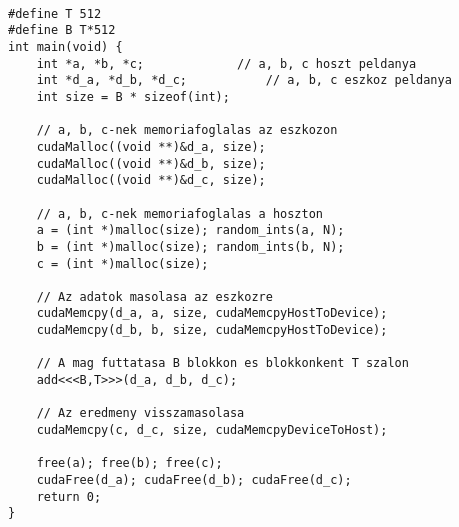 \begin{lstlisting}[frame=single]  % Start your code-block

#define T 512
#define B T*512
int main(void) {
    int *a, *b, *c;				// a, b, c hoszt peldanya
    int *d_a, *d_b, *d_c;			// a, b, c eszkoz peldanya
    int size = B * sizeof(int);
    
    // a, b, c-nek memoriafoglalas az eszkozon
    cudaMalloc((void **)&d_a, size);
    cudaMalloc((void **)&d_b, size);
    cudaMalloc((void **)&d_c, size);
    
    // a, b, c-nek memoriafoglalas a hoszton
    a = (int *)malloc(size); random_ints(a, N);
    b = (int *)malloc(size); random_ints(b, N);
    c = (int *)malloc(size);
    
    // Az adatok masolasa az eszkozre
    cudaMemcpy(d_a, a, size, cudaMemcpyHostToDevice);
    cudaMemcpy(d_b, b, size, cudaMemcpyHostToDevice);
    
    // A mag futtatasa B blokkon es blokkonkent T szalon
    add<<<B,T>>>(d_a, d_b, d_c);
    
    // Az eredmeny visszamasolasa
    cudaMemcpy(c, d_c, size, cudaMemcpyDeviceToHost);
    
    free(a); free(b); free(c);
    cudaFree(d_a); cudaFree(d_b); cudaFree(d_c);
    return 0;
}
\end{lstlisting}

















